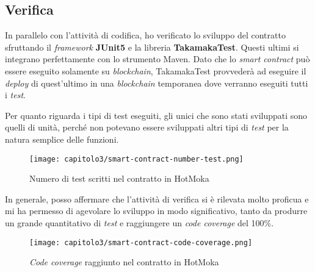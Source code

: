 \subsection{Verifica}
In parallelo con l'attività di codifica, ho verificato lo sviluppo del contratto sfruttando il \textit{framework} \textbf{JUnit5} e la libreria \textbf{TakamakaTest}. Questi ultimi si integrano perfettamente con lo strumento Maven. Dato che lo \textit{smart contract} può essere eseguito solamente su \textit{blockchain}, TakamakaTest provvederà ad eseguire il \textit{deploy} di quest'ultimo in una \textit{blockchain} temporanea dove verranno eseguiti tutti i \textit{test}. 

Per quanto riguarda i tipi di test eseguiti, gli unici che sono stati sviluppati sono quelli di unità, perché non potevano essere sviluppati altri tipi di \textit{test} per la natura semplice delle funzioni.

\begin{figure}[h!]
  \centering
  \texttt{[image: capitolo3/smart-contract-number-test.png]}
  \caption{Numero di test scritti nel contratto in HotMoka}
\end{figure}

In generale, posso affermare che l'attività di verifica si è rilevata molto proficua e mi ha permesso di agevolare lo sviluppo in modo significativo, tanto da produrre un grande quantitativo di \textit{test} e raggiungere un \textit{code coverage} del 100\%.

\begin{figure}[h!]
  \centering
  \texttt{[image: capitolo3/smart-contract-code-coverage.png]}
  \caption{\textit{Code coverage} raggiunto nel contratto in HotMoka}
\end{figure}
